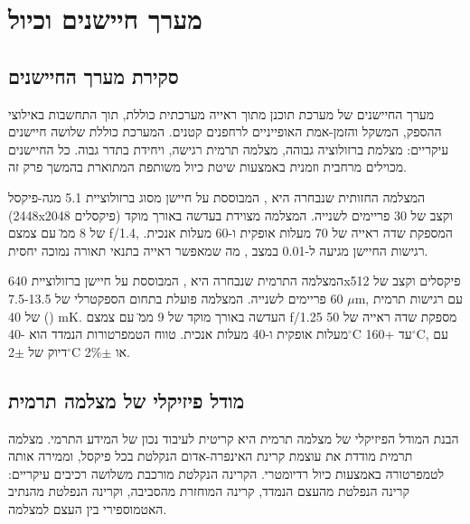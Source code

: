 
\section{מערך חיישנים וכיול}
\label{sec:ch03_sensors}

\subsection{סקירת מערך החיישנים}
\label{sec:ch03_overview}

מערך החיישנים של מערכת  תוכנן מתוך ראייה מערכתית כוללת, תוך התחשבות באילוצי ההספק, המשקל והזמן-אמת האופייניים לרחפנים קטנים. המערכת כוללת שלושה חיישנים עיקריים: מצלמת  ברזולוציה גבוהה, מצלמה תרמית רגישה, ויחידת  בתדר גבוה. כל החיישנים מכוילים מרחבית וזמנית באמצעות שיטת כיול משותפת המתוארת בהמשך פרק זה.

המצלמה החזותית שנבחרה היא , המבוססת על חיישן  מסוג  ברזולוציית 5.1 מגה-פיקסל (2448x2048 פיקסלים) וקצב של 30 פריימים לשנייה. המצלמה מצוידת בעדשה באורך מוקד של 8 מ\"מ עם צמצם f/1.4, המספקת שדה ראייה של 70 מעלות אופקית ו-60 מעלות אנכית. רגישות החיישן מגיעה ל-0.01  במצב , מה שמאפשר ראייה בתנאי תאורה נמוכה יחסית.

המצלמה התרמית שנבחרה היא , המבוססת על חיישן  ברזולוציית 640x512 פיקסלים וקצב של 60 פריימים לשנייה. המצלמה פועלת בתחום הספקטרלי של 7.5-13.5 $\mu$m, עם רגישות תרמית () של 40 mK. העדשה באורך מוקד של 9 מ\"מ עם צמצם f/1.25 מספקת שדה ראייה של 50 מעלות אופקית ו-40 מעלות אנכית. טווח הטמפרטורות הנמדד הוא -40$^{\circ}$C עד +160$^{\circ}$C, עם דיוק של $\pm$2$^{\circ}$C או $\pm$2\%.

\subsection{מודל פיזיקלי של מצלמה תרמית}
\label{sec:ch03_thermal_model}

הבנת המודל הפיזיקלי של מצלמה תרמית היא קריטית לעיבוד נכון של המידע התרמי. מצלמה תרמית מודדת את עוצמת קרינת האינפרה-אדום הנקלטת בכל פיקסל, וממירה אותה לטמפרטורה באמצעות כיול רדיומטרי. הקרינה הנקלטת מורכבת משלושה רכיבים עיקריים: קרינה הנפלטת מהעצם הנמדד, קרינה המוחזרת מהסביבה, וקרינה הנפלטת מהנתיב האטמוספירי בין העצם למצלמה.

